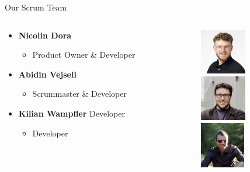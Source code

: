 \documentclass[
    ngerman,%
    authorontitle=true,
]{bfhbeamer}
\begin{document}
    \begin{frame}{Our Scrum Team}
        \begin{columns}
            \begin{column}{0.7\textwidth}
                \begin{itemize}
                    \item \textbf{Nicolin Dora}
                    \begin{itemize}
                        \item Product Owner \& Developer
                    \end{itemize}
                    \item \textbf{Abidin Vejseli}
                    \begin{itemize}
                        \item Scrummaster \& Developer
                    \end{itemize}
                    \item \textbf{Kilian Wampfler} Developer
                    \begin{itemize}
                        \item Developer
                    \end{itemize}
                \end{itemize}
            \end{column}
            \begin{column}{0.3\textwidth}
                \includegraphics[height=2cm]{pictures/dora_2} \\
                \vspace{1em}
                \includegraphics[height=2cm]{pictures/vejseli_2} \\
                \vspace{1em}
                \includegraphics[height=2cm]{pictures/wampfler_2} \\
                \vspace{1em}
            \end{column}
        \end{columns}
    \end{frame}
\end{document}
